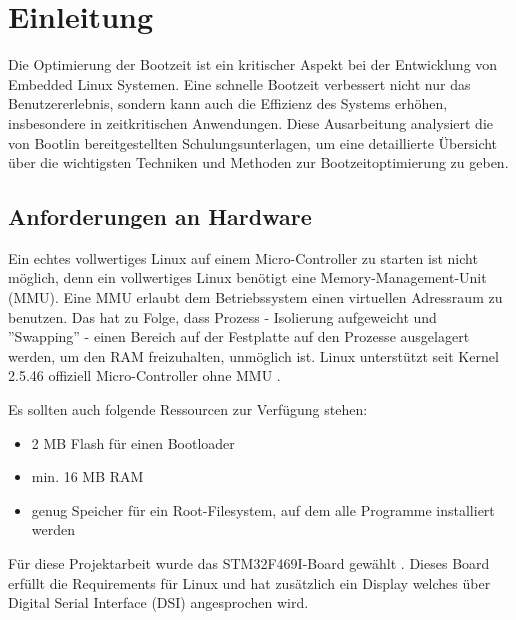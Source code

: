 
\section{Einleitung}
Die Optimierung der Bootzeit ist ein kritischer Aspekt bei der Entwicklung von Embedded Linux Systemen. Eine schnelle Bootzeit verbessert nicht nur das Benutzererlebnis, sondern kann auch die Effizienz des Systems erhöhen, insbesondere in zeitkritischen Anwendungen. Diese Ausarbeitung analysiert die von Bootlin bereitgestellten Schulungsunterlagen, um eine detaillierte Übersicht über die wichtigsten Techniken und Methoden zur Bootzeitoptimierung zu geben.

\subsection{Anforderungen an Hardware}
Ein echtes vollwertiges Linux auf einem Micro-Controller zu starten ist nicht möglich,
denn ein vollwertiges Linux benötigt eine Memory-Management-Unit (MMU). Eine MMU
erlaubt dem Betriebssystem einen virtuellen Adressraum zu benutzen. Das hat zu Folge,
dass Prozess - Isolierung aufgeweicht und ''Swapping'' - einen Bereich auf der
Festplatte auf den Prozesse ausgelagert werden, um den RAM freizuhalten,
unmöglich ist. Linux unterstützt seit Kernel 2.5.46 offiziell Micro-Controller ohne
MMU \cite{uCLinuxWikipedia}.

Es sollten auch folgende Ressourcen zur Verfügung stehen:
\begin{itemize}
	\item 2 MB Flash für einen Bootloader
	\item min. 16 MB RAM
	\item genug Speicher für ein Root-Filesystem, auf dem alle Programme installiert werden
\end{itemize}


Für diese Projektarbeit wurde das STM32F469I-Board gewählt \cite{stmWebsiteBoard}.
Dieses Board erfüllt die Requirements für Linux und hat zusätzlich ein Display welches
über Digital Serial Interface (DSI) angesprochen wird.
